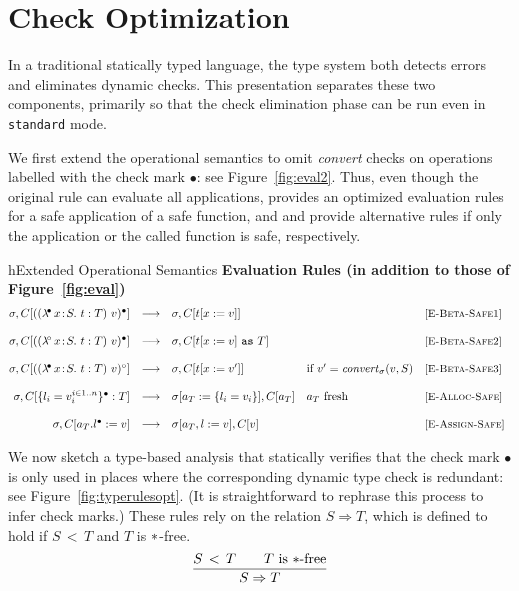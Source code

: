 \documentclass{article}
\newcommand{\myclearpage}{}
\newcommand{\fun}[1]{\mbox{\it #1\/}}
\newcommand{\safe}{\bullet}
\newcommand{\unsafe}{\circ}
\newcommand{\lam}[5]{\lambda\!^{#1}\,#2\!:\!#3.\,\,#5:#4}
\newcommand{\app}[3]{(#2~#3)^{#1}}
\newcommand{\dynamic}{\t{*}}
\newcommand{\cast}[2]{#1~\t{as}~#2}
\newcommand{\subtypeword}{\,<\,}
\newcommand{\subtype}[2]{#1 \subtypeword #2}
\newcommand{\convert}[2]{{#1}\convertword{#2}}
\newcommand{\convertword}{\mbox{\,\,$\sim :$\,\,}}
\newcommand{\implies}[2]{#1\Implies #2}
\renewcommand{\t}[1]{{\tt #1}}
\newcommand{\Implies}[0]{\Rightarrow}
\newcommand{\red}[0]{\longrightarrow}  %
\newcommand{\lred}[0]{\red}  %
\newcommand{\objty}[1]{\{#1\}}
\newcommand{\obje}[3]{\{#2\}^{#1}:{#3}}
\newcommand{\objv}[1]{\{#1\}}
\newcommand{\objset}[4]{#2.#3^{#1}:=#4}
\renewcommand{\convert}[2]{\fun{convert}_{\sigma}(#1,#2)}
\begin{document}
\myclearpage
\section{Check Optimization}
\label{sec:opt}

In a traditional statically typed language, the type system both detects errors and eliminates dynamic checks.
This presentation separates these two components, primarily so that the check elimination phase 
can be run even in   \t{standard} mode.
 
We first extend the operational semantics to omit \emph{convert} checks on operations labelled with the check mark $\safe$: see Figure~\ref{fig:eval2}. Thus, even though the original rule  can evaluate all applications,  provides an optimized evaluation rules for a safe application of a safe function, and  and  provide alternative rules if only the application or the called function is safe, respectively.

\begin{displayfigure}{h}{Extended Operational Semantics}
\label{fig:eval2} 
\footnotesize
{\bf Evaluation Rules (in addition to those of Figure~\ref{fig:eval})}
\[
\begin{array}{@{}rclll}
	\sigma,C[{\app{\safe}{(\lam{\safe}{x}{S}{T}{t})}{v}}]
	&\lred&
	\sigma,C[{t[x:=v]}]
	&&\rel{E-Beta-Safe1}
\\~\\
	\sigma,C[{\app{\safe}{(\lam{\unsafe}{x}{S}{T}{t})}{v}}]
	&\lred&
	\sigma,C[\cast{t[x:=v]}{T}]
	&&\rel{E-Beta-Safe2}
\\~\\
	\sigma,C[{\app{\unsafe}{(\lam{\safe}{x}{S}{T}{t})}{v}}]
	&\lred&
	\sigma,C[{t[x:=v']}]
	&\mbox{if $v'=\convert v S$}
	&\rel{E-Beta-Safe3}
\\~\\
	\sigma,C[\obje{\safe}{l_i=v_i^{i\in 1..n}}{T}]
	&\lred&
	\sigma[a_T:=\objv{l_i=v_i}],C[a_T] 
	&\mbox{$a_T$ fresh}
	&\rel{E-Alloc-Safe} 
\\~\\
	\sigma,C[\objset{\safe}{a_T}{l}{v}]
	&\lred&
	\sigma[a_T,l:=v],C[v] 
	& 
	&\rel{E-Assign-Safe} 
\end{array}
\]
 \end{displayfigure} 


We now sketch a type-based analysis that statically verifies that the check mark $\safe$ is only used in places where the
corresponding dynamic type check is redundant: see Figure~\ref{fig:typerulesopt}. (It is straightforward to rephrase this process to infer check marks.)
These rules rely on the relation $S\Implies T$, which is defined to hold if $\subtype S T$ and $T$ is $\dynamic$-free.
\[
\frac{\subtype S T \qquad \mbox{$T$ is $\dynamic$-free}}
	{\implies S T}
\]
\end{document}
